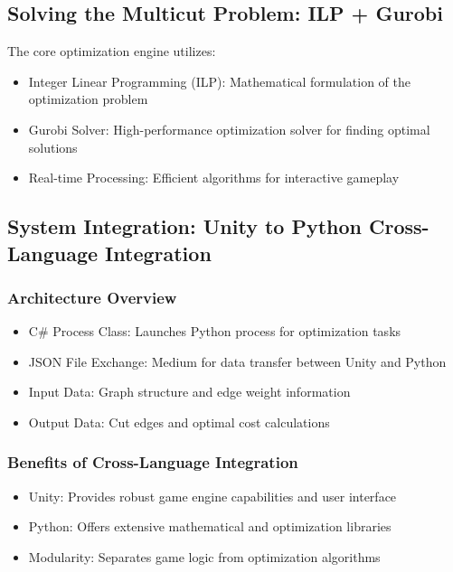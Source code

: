 \documentclass[english]{tudscrreprt}
\begin{document}
\subsection{Solving the Multicut Problem: ILP + Gurobi}
The core optimization engine utilizes:

\begin{itemize}
  \item Integer Linear Programming (ILP): Mathematical formulation of the optimization problem \cite{schrijver2003}
  \item Gurobi Solver: High-performance optimization solver for finding optimal solutions \cite{gurobi2023}
  \item Real-time Processing: Efficient algorithms for interactive gameplay
\end{itemize}

\subsection{System Integration: Unity to Python Cross-Language Integration}

\subsubsection{Architecture Overview}
\begin{itemize}
  \item C\# Process Class: Launches Python process for optimization tasks
  \item JSON File Exchange: Medium for data transfer between Unity and Python
  \item Input Data: Graph structure and edge weight information
  \item Output Data: Cut edges and optimal cost calculations
\end{itemize}

\subsubsection{Benefits of Cross-Language Integration}
\begin{itemize}
  \item Unity: Provides robust game engine capabilities and user interface \cite{unity2023}
  \item Python: Offers extensive mathematical and optimization libraries
  \item Modularity: Separates game logic from optimization algorithms
\end{itemize}
\end{document}
